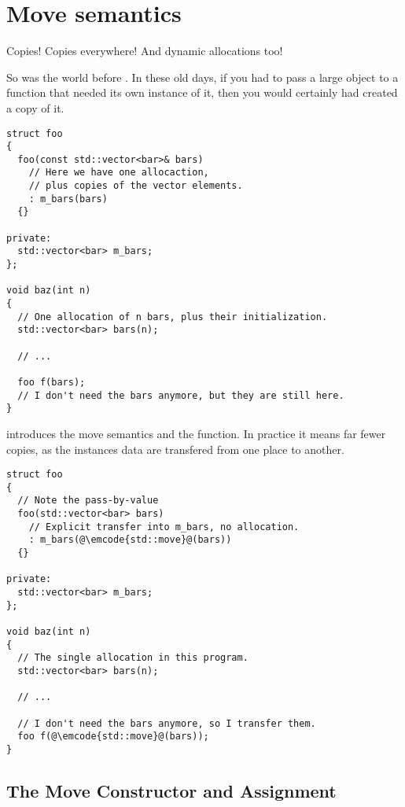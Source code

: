 \section{Move semantics}
\label{move}

Copies! Copies everywhere! And dynamic allocations too!

So was the world before . In these old days, if you had to pass
a large object to a function that needed its own instance of it, then
you would certainly had created a copy of it.

\begin{lstlisting}
struct foo
{
  foo(const std::vector<bar>& bars)
    // Here we have one allocaction,
    // plus copies of the vector elements.
    : m_bars(bars)
  {}

private:
  std::vector<bar> m_bars;
};

void baz(int n)
{
  // One allocation of n bars, plus their initialization.
  std::vector<bar> bars(n);
  
  // ...
  
  foo f(bars);
  // I don't need the bars anymore, but they are still here.
}
\end{lstlisting}

 introduces the move semantics and the 
function. In practice it means far fewer copies, as the instances data
are transfered from one place to another.

\begin{lstlisting}
struct foo
{
  // Note the pass-by-value
  foo(std::vector<bar> bars)
    // Explicit transfer into m_bars, no allocation.
    : m_bars(@\emcode{std::move}@(bars))
  {}

private:
  std::vector<bar> m_bars;
};

void baz(int n)
{
  // The single allocation in this program.
  std::vector<bar> bars(n);

  // ...

  // I don't need the bars anymore, so I transfer them.
  foo f(@\emcode{std::move}@(bars));
}
\end{lstlisting}

\subsection{The Move Constructor and Assignment}

